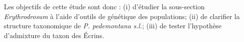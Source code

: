 Les objectifs de cette étude sont donc : (i) d'étudier la sous-section \textit{Erythrodrosum} à l'aide d'outils de génétique des populations; (ii) de clarifier la structure taxonomique de \textit{P. pedemontana s.l.}; (iii) de tester l'hypothèse d'admixture du taxon des Écrins.




